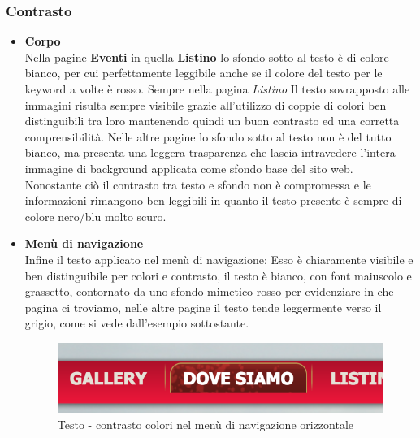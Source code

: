 \documentclass[../Relazione.tex]{subfiles}
\begin{document}
		\subsubsection{Contrasto}
		\begin{itemize}
            \item \textbf{Corpo}
            \vspace*{5mm}\\Nella pagine \textbf{Eventi} in quella \textbf{Listino} lo sfondo sotto al testo è di colore bianco, per cui perfettamente leggibile anche se il colore del testo per le keyword a volte è rosso.
			Sempre nella pagina \emph{Listino} Il testo sovrapposto alle immagini risulta sempre visibile grazie all'utilizzo di coppie di colori ben distinguibili tra loro mantenendo quindi un buon contrasto ed una corretta comprensibilità.
			Nelle altre pagine lo sfondo sotto al testo non è del tutto bianco, ma presenta una leggera trasparenza che lascia intravedere l'intera immagine di background applicata come sfondo base del sito web.\\
			Nonostante ciò il contrasto tra testo e sfondo non è compromessa e le informazioni rimangono ben leggibili in quanto il testo presente è sempre di colore nero/blu molto scuro.\\
			\item \textbf{Menù di navigazione}
            \vspace*{5mm}\\Infine il testo applicato nel menù di navigazione: Esso è chiaramente visibile e ben distinguibile per colori e contrasto, il testo è bianco, con font maiuscolo e grassetto, contornato da uno sfondo mimetico rosso per evidenziare in che pagina ci troviamo, nelle altre pagine il testo tende leggermente verso il grigio, come si vede dall'esempio sottostante.

            	\begin{figure}[!h]
            		\centering
            		\includegraphics[scale=0.7]{img/contenuto/Testo.png}
            		\caption{Testo - contrasto colori nel menù di navigazione orizzontale}
            		\label{fig:label}
            	\end{figure}

        \end{itemize}
			
\end{document}
